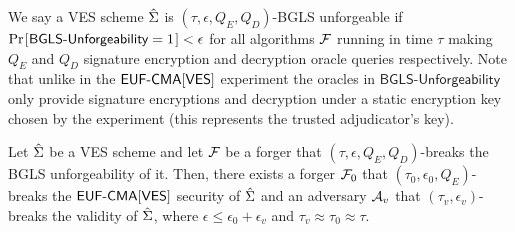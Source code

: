 \begin{definition}
\label{original-unforgeability}

We say a VES scheme $\hat{\Sigma}$ is $(\tau, \epsilon, Q_E, Q_D)$-BGLS unforgeable if $\prob{\textsf{BGLS-Unforgeability} = 1} < \epsilon$ for all algorithms $\mathcal{F}$ running in time $\tau$ making $Q_E$ and $Q_D$ signature encryption and decryption oracle queries respectively.
Note that unlike in the $\textsf{EUF-CMA}[\textsf{VES}]$ experiment the oracles in $\textsf{BGLS-Unforgeability}$ only provide signature encryptions and decryption under a static encryption key chosen by the experiment (this represents the trusted adjudicator's key).

 \begin{center}
 \end{center}


\end{definition}

\begin{theorem}
  Let $\hat{\Sigma}$ be a VES scheme and let $\mathcal{F}$ be a forger that $(\tau, \epsilon, Q_E, Q_D)$-breaks the BGLS unforgeability of it.
  Then, there exists a forger $\mathcal{F}_0$ that $(\tau_0, \epsilon_0, Q_E)$-breaks the $\textsf{EUF-CMA}[\textsf{VES}]$ security of $\hat{\Sigma}$ and an adversary $\mathcal{A}_v$ that $(\tau_v, \epsilon_v)$-breaks the validity of $\hat{\Sigma}$, where $\epsilon \leq \epsilon_0 + \epsilon_v$ and $\tau_v \approx \tau_0 \approx \tau$.
\end{theorem}

